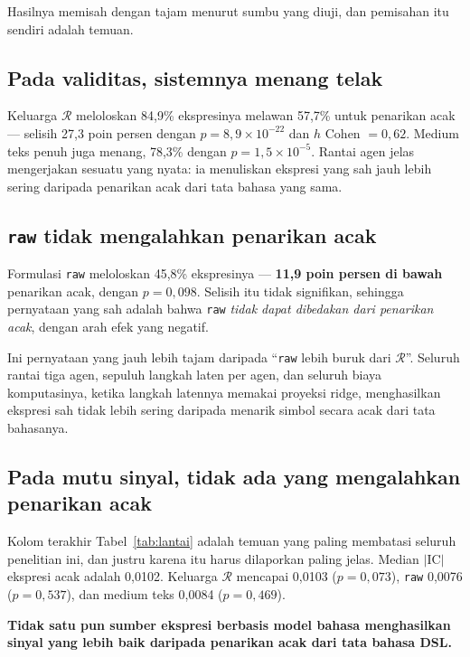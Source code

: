 \documentclass{laporanta1statugm}
\newcommand{\code}[1]{\texttt{#1}}
\begin{document}


Hasilnya memisah dengan tajam menurut sumbu yang diuji, dan pemisahan itu
sendiri adalah temuan.

\subsection{Pada validitas, sistemnya menang telak}

Keluarga $\mathcal{R}$ meloloskan 84,9\% ekspresinya melawan 57,7\% untuk
penarikan acak --- selisih 27,3 poin persen dengan
$p = 8{,}9\times10^{-22}$ dan $h$ Cohen $= 0{,}62$. Medium teks penuh juga
menang, 78,3\% dengan $p = 1{,}5\times10^{-5}$. Rantai agen jelas mengerjakan
sesuatu yang nyata: ia menuliskan ekspresi yang sah jauh lebih sering daripada
penarikan acak dari tata bahasa yang sama.

\subsection{\code{raw} tidak mengalahkan penarikan acak}

Formulasi \code{raw} meloloskan 45,8\% ekspresinya --- \textbf{11,9 poin persen
di bawah} penarikan acak, dengan $p = 0{,}098$. Selisih itu tidak signifikan,
sehingga pernyataan yang sah adalah bahwa \code{raw} \emph{tidak dapat
dibedakan dari penarikan acak}, dengan arah efek yang negatif.

Ini pernyataan yang jauh lebih tajam daripada ``\code{raw} lebih buruk dari
$\mathcal{R}$''. Seluruh rantai tiga agen, sepuluh langkah laten per agen, dan
seluruh biaya komputasinya, ketika langkah latennya memakai proyeksi ridge,
menghasilkan ekspresi sah tidak lebih sering daripada menarik simbol secara
acak dari tata bahasanya.

\subsection{Pada mutu sinyal, tidak ada yang mengalahkan penarikan acak}

Kolom terakhir Tabel~\ref{tab:lantai} adalah temuan yang paling membatasi
seluruh penelitian ini, dan justru karena itu harus dilaporkan paling jelas.
Median $\lvert\mathrm{IC}\rvert$ ekspresi acak adalah 0,0102. Keluarga
$\mathcal{R}$ mencapai 0,0103 ($p = 0{,}073$), \code{raw} 0,0076
($p = 0{,}537$), dan medium teks 0,0084 ($p = 0{,}469$).

\textbf{Tidak satu pun sumber ekspresi berbasis model bahasa menghasilkan
sinyal yang lebih baik daripada penarikan acak dari tata bahasa DSL.}
\end{document}
